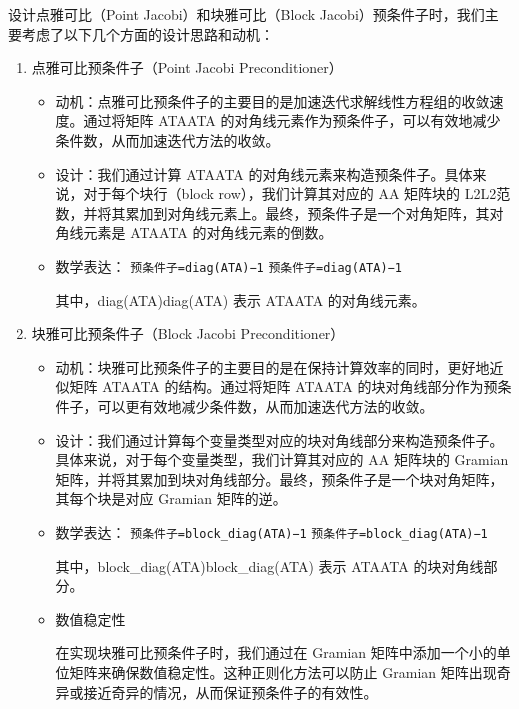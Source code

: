 \documentclass{ctexart}
\begin{document}
设计点雅可比（Point Jacobi）和块雅可比（Block Jacobi）预条件子时，我们主要考虑了以下几个方面的设计思路和动机：
\begin{enumerate}
	\item 点雅可比预条件子（Point Jacobi Preconditioner）

	      \begin{itemize}
		      \item 动机：点雅可比预条件子的主要目的是加速迭代求解线性方程组的收敛速度。通过将矩阵 ATAATA 的对角线元素作为预条件子，可以有效地减少条件数，从而加速迭代方法的收敛。

		      \item 设计：我们通过计算 ATAATA 的对角线元素来构造预条件子。具体来说，对于每个块行（block row），我们计算其对应的 AA 矩阵块的 L2L2​ 范数，并将其累加到对角线元素上。最终，预条件子是一个对角矩阵，其对角线元素是 ATAATA 的对角线元素的倒数。

		      \item 数学表达：
		            \texttt{预条件子=diag(ATA)−1}
		            \texttt{预条件子=diag(ATA)−1}

		            其中，diag(ATA)diag(ATA) 表示 ATAATA 的对角线元素。
	      \end{itemize}


	\item 块雅可比预条件子（Block Jacobi Preconditioner）

	      \begin{itemize}
		      \item 动机：块雅可比预条件子的主要目的是在保持计算效率的同时，更好地近似矩阵 ATAATA 的结构。通过将矩阵 ATAATA 的块对角线部分作为预条件子，可以更有效地减少条件数，从而加速迭代方法的收敛。

		      \item 设计：我们通过计算每个变量类型对应的块对角线部分来构造预条件子。具体来说，对于每个变量类型，我们计算其对应的 AA 矩阵块的 Gramian 矩阵，并将其累加到块对角线部分。最终，预条件子是一个块对角矩阵，其每个块是对应 Gramian 矩阵的逆。

		      \item 数学表达：
		            \texttt{预条件子=block\_diag(ATA)−1}
		            \texttt{预条件子=block\_diag(ATA)−1}

		            其中，block\_diag(ATA)block\_diag(ATA) 表示 ATAATA 的块对角线部分。

		      \item 数值稳定性

		            在实现块雅可比预条件子时，我们通过在 Gramian 矩阵中添加一个小的单位矩阵来确保数值稳定性。这种正则化方法可以防止 Gramian 矩阵出现奇异或接近奇异的情况，从而保证预条件子的有效性。


\end{itemize}
\end{enumerate}
\end{document}
